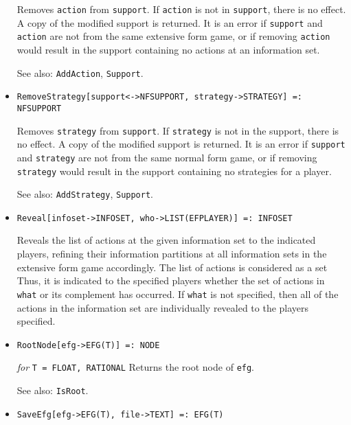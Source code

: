 \begin{itemize}
\bd
Removes \verb+action+ from \verb+support+.  If \verb+action+ is
not in \verb+support+, there is no effect.  A copy of the modified
support is returned.  It is an error if \verb+support+ and \verb+action+
are not from the same extensive form game, or if removing \verb+action+
would result in the support containing no actions at an information set.
\item [See also:] \verb+AddAction+, \verb+Support+.
\ed

\item
\protect \large \begin{verbatim}
RemoveStrategy[support<->NFSUPPORT, strategy->STRATEGY] =: NFSUPPORT
\end{verbatim}\normalsize

\bd
Removes \verb+strategy+ from \verb+support+.  If \verb+strategy+ is not in
the support, there is no effect.  A copy of the modified support is
returned.  It is an error if \verb+support+ and \verb+strategy+ are
not from the same normal form game, or if removing \verb+strategy+
would result in the support containing no strategies for a player.
\item [See also:] \verb+AddStrategy+, \verb+Support+.
\ed

\item
\protect \large \begin{verbatim}
Reveal[infoset->INFOSET, who->LIST(EFPLAYER)] =: INFOSET
\end{verbatim}\normalsize

\bd
Reveals the list of actions at the given information
set to the indicated players, refining their information partitions at
all information sets in the extensive form game accordingly.  The list
of actions is considered as a set Thus, it is indicated to the
specified players whether the set of actions in \verb+what+ or its
complement has occurred.  If \verb+what+ is not specified, then all of
the actions in the information set are individually revealed to
the players specified.  
\ed

\item
\protect \large \begin{verbatim}
RootNode[efg->EFG(T)] =: NODE
\end{verbatim}\normalsize

{\it for} {\tt T = FLOAT, RATIONAL}
\bd
Returns the root node of \verb+efg+.
\item [See also:] \verb+IsRoot+.
\ed


\item
\protect \large \begin{verbatim}
SaveEfg[efg->EFG(T), file->TEXT] =: EFG(T)
\end{verbatim}\normalsize


\end{itemize}
